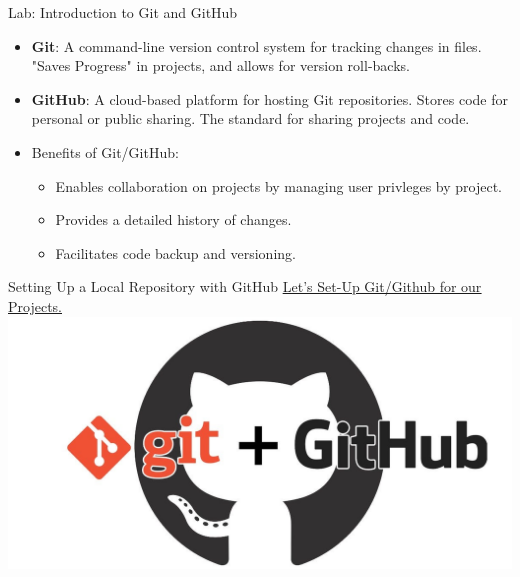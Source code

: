 \documentclass[aspectratio=169,xcolor=dvipsnames]{beamer}
\begin{document}
\begin{frame}{Lab: Introduction to Git and GitHub}
\begin{itemize}
    \setlength\itemsep{0.5cm}
    \item \textbf{Git}: A command-line version control system for tracking changes in files. "Saves Progress" in projects, and allows for version roll-backs. 
    \item \textbf{GitHub}: A cloud-based platform for hosting Git repositories. Stores code for personal or public sharing. The standard for sharing projects and code.
    \item Benefits of Git/GitHub:
    \begin{itemize}
        \item Enables collaboration on projects by managing user privleges by project.
        \item Provides a detailed history of changes.
        \item Facilitates code backup and versioning.
    \end{itemize}
\end{itemize}
\end{frame}

\begin{frame}{Setting Up a Local Repository with GitHub}
\centering
\href{run:./Getting Started with Git on Windows and MacOS.pdf}{\color{blue} \underline{Let's Set-Up Git/Github for our Projects.}}
\vspace{0.2cm}
\includegraphics[scale=0.2]{images/github_git.jpg}
\end{frame}
\end{document}
